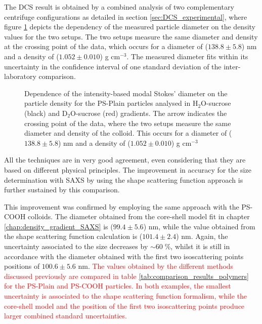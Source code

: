 The DCS result is obtained by a combined analysis of two complementary centrifuge configurations as detailed in section \ref{sec:DCS_experimental}, where figure \ref{fig:DCSCombinedStokes} depicts the dependency of the measured particle diameter on the density values for the two setups. The two setups measure the same diameter and density at the crossing point of the data, which occurs for a diameter of ($138.8\pm5.8$) nm and a density of ($1.052\pm0.010$) g cm$^{-3}$. The measured diameter fits within its uncertainty in the confidence interval of one standard deviation of the inter-laboratory comparison.

\begin{figure}
	\begin{center}
		
	\end{center}
	\caption[Simultaneous size and density determination of the PS-Plain particles with a DCS combined approach.]{Dependence of the intensity-based modal Stokes' diameter on the particle density for the PS-Plain particles analysed in H$_2$O-sucrose (black) and D$_2$O-sucrose (red) gradients. The arrow indicates the crossing point of the data, where the two setups measure the same diameter and density of the colloid. This occurs for a diameter of ($138.8\pm5.8$) nm and a density of ($1.052\pm0.010$) g cm$^{-3}$}
	\label{fig:DCSCombinedStokes}
\end{figure}

All the techniques are in very good agreement, even considering that they are based on different physical principles. The improvement in accuracy for the size determination with SAXS by using the shape scattering function approach is further sustained by this comparison. 

This improvement was confirmed by employing the same approach with the PS-COOH colloids. The diameter obtained from the core-shell model fit in chapter \ref{chap:density_gradient_SAXS} is ($99.4\pm5.6$) nm, while the value obtained from the shape scattering function calculation is ($101.4\pm2.4$) nm. Again, the uncertainty associated to the size decreases by $\sim 60\;\%$, whilst it is still in accordance with the diameter obtained with the first two isoscattering points positions of $100.6\pm 5.6$ nm. \textcolor{red}{The values obtained by the different methods discussed previously are compared in table \ref{tab:comparison_results_polymers} for the PS-Plain and PS-COOH particles. In both examples, the smallest uncertainty is associated to the shape scattering function formalism, while the core-shell model and the position of the first two isoscattering points produce larger combined standard uncertainties.}

